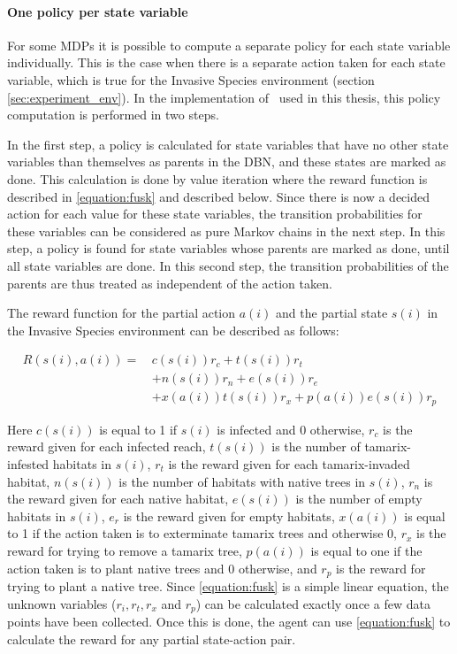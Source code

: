 \paragraph{One policy per state variable}
\label{sec:one_policy_per_state_variable}

For some MDPs it is possible to compute a separate policy for each state
variable individually. This is the case when there is a separate action taken
for each state variable, which is true for the Invasive Species environment
(section \ref{sec:experiment_env}). In the implementation of \etre\ used in
this thesis, this policy computation is performed in two steps. 

In the first step, a policy is calculated for state variables that have no
other state variables than themselves as parents in the DBN, and these states
are marked as done. This calculation is done by value iteration where the reward function
is described in \eqref{equation:fusk} and described below. Since there is now a decided action for each value for
these state variables, the transition probabilities for these variables can be
considered as pure Markov chains in the next step. In this step, a policy is
found for state variables whose parents are marked as done, until all state
variables are done.  In this second step, the transition probabilities of the
parents are thus treated as independent of the action taken.

The reward function for the partial action $a(i)$ and the partial state $s(i)$ in the Invasive Species environment can be described as follows:

\begin{align}
\label{equation:fusk}
R(s(i),a(i)) = \, 
 & c(s(i)) r_c + t(s(i)) r_t  \nonumber \\
 & + n(s(i)) r_n + e(s(i)) r_e   \nonumber \\
 & +  x(a(i)) t(s(i)) r_x + p(a(i)) e(s(i)) r_p
\end{align}

Here $c(s(i))$ is equal to 1 if $s(i)$ is infected and 0 otherwise, $r_c$ is the reward given for each infected reach, $t(s(i))$ is the number of tamarix-infested habitats in $s(i)$, $r_t$ is the reward given for each tamarix-invaded habitat, $n(s(i))$ is the number of habitats with native trees in $s(i)$, $r_n$ is the reward given for each native habitat, $e(s(i))$ is the number of empty habitats in $s(i)$, $e_r$ is the reward given for empty habitats, $x(a(i))$ is equal to 1 if the action taken is to exterminate tamarix trees and otherwise 0, $r_x$ is the reward for trying to remove a tamarix tree, $p(a(i))$ is equal to one if the action taken is to plant native trees and 0 otherwise, and $r_p$ is the reward for trying to plant a native tree. 
Since \eqref{equation:fusk} is a simple linear equation, the unknown variables ($r_i, r_t, r_x$ and $r_p$) can be calculated exactly once a few data points have been collected. Once this is done, the agent can use \eqref{equation:fusk} to calculate the reward for any partial state-action pair. 

